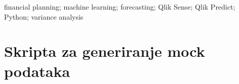 \documentclass[zavrsnirad]{fer}
\begin{document}
\begin{abstract}
  This bachelor thesis explores financial planning procedures and methods for analysing deviations between planned and realised financial indicators. Special emphasis is placed on the application of statistical and machine learning methods for forecasting financial trends. Data were collected from a real business environment, anonymised, and processed using Qlik Sense. Qlik Predict was used as an automated no-code forecasting solution, while ARIMA, XGBoost, and LSTM models were implemented in Python for benchmarking. The results demonstrate that machine learning methods can significantly improve the accuracy of financial forecasts compared to traditional approaches.
\end{abstract}

\begin{keywords}
  financial planning; machine learning; forecasting; Qlik Sense; Qlik Predict; Python; variance analysis
\end{keywords}


\backmatter

\chapter{Skripta za generiranje mock podataka}
\label{app:mock_skripta}

\end{document}

